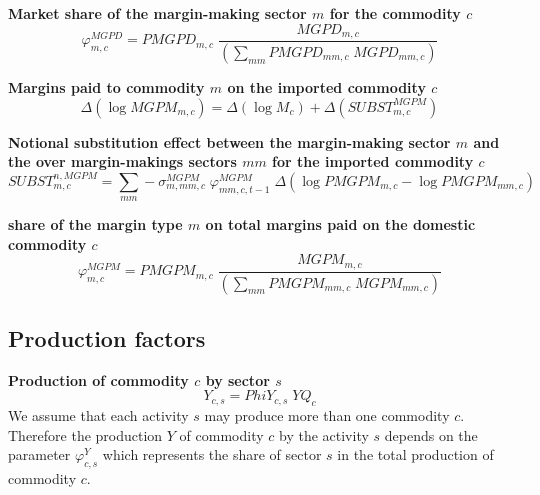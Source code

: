 \documentclass[12pt]{article}
\numberwithin{equation}{section}
\begin{document}
\noindent\textbf{Market share of the margin-making sector $m$  for the commodity $c$} \\
\begin{dmath}
\varphi^{MGPD}_{m, c} = PMGPD_{m, c} \; \frac{MGPD_{m, c}}{\left( \sum_{mm} PMGPD_{mm, c} \; MGPD_{mm, c} \right)}
\end{dmath}

\noindent\textbf{Margins paid to commodity $m$ on the imported commodity $c$} \\
\begin{dmath}
\varDelta \left(\operatorname{log} MGPM_{m, c}\right) = \varDelta \left(\operatorname{log} M_{c}\right) + \varDelta \left(SUBST^{MGPM}_{m, c}\right)
\end{dmath}

\noindent\textbf{Notional substitution effect between the margin-making sector $m$ and the over margin-makings sectors $mm$ for the imported commodity $c$} \\
\begin{dmath}
SUBST^{n,MGPM}_{m, c} = \sum_{mm} -\sigma^{MGPM}_{m, mm, c} \; \varphi^{MGPM}_{mm, c, t-1} \; \varDelta \left(\operatorname{log} PMGPM_{m, c} - \operatorname{log} PMGPM_{mm, c}\right)
\end{dmath}

\noindent\textbf{ share of the margin type $m$ on total margins paid on the domestic commodity $c$} \\
\begin{dmath}
\varphi^{MGPM}_{m, c} = PMGPM_{m, c} \; \frac{MGPM_{m, c}}{\left( \sum_{mm} PMGPM_{mm, c} \; MGPM_{mm, c} \right)}
\end{dmath}



\subsection{Production factors}



\noindent\textbf{Production of commodity $c$ by sector $s$} \\
\begin{dmath}
Y_{c, s} = PhiY_{c, s} \; YQ_{c}
\end{dmath}
We assume that each activity $s$ may produce more than one commodity $c$. Therefore the production $Y$ of commodity $c$ by the activity $s$ depends on the parameter $\varphi^{Y}_{c, s}$ which represents the share of sector $s$ in the total production of commodity $c$. \\
\end{document}
